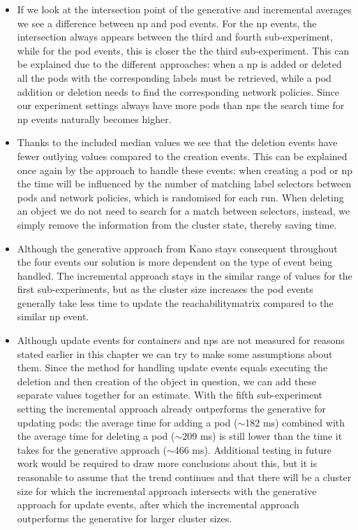 \begin{itemize}
    \item If we look at the intersection point of the generative and incremental averages we see a difference between \acrshort{np} and pod events. For the \acrshort{np} events, the intersection always appears between the third and fourth sub-experiment, while for the pod events, this is closer the the third sub-experiment. This can be explained due to the different approaches: when a \acrshort{np} is added or deleted all the pods with the corresponding labels must be retrieved, while a pod addition or deletion needs to find the corresponding network policies. Since our experiment settings always have more pods than \acrshort{np}s the search time for \acrshort{np} events naturally becomes higher.
    
    \item Thanks to the included median values we see that the deletion events have fewer outlying values compared to the creation events. This can be explained once again by the approach to handle these events: when creating a pod or \acrshort{np} the time will be influenced by the number of matching label selectors between pods and network policies, which is randomised for each run. When deleting an object we do not need to search for a match between selectors, instead, we simply remove the information from the cluster state, thereby saving time.
    
    \item Although the generative approach from Kano stays consequent throughout the four events our solution is more dependent on the type of event being handled. The incremental approach stays in the similar range of values for the first sub-experiments, but as the cluster size increases the pod events generally take less time to update the reachabilitymatrix compared to the similar \acrshort{np} event. 
    
    \item Although update events for containers and \acrshort{np}s are not measured for reasons stated earlier in this chapter we can try to make some assumptions about them. Since the method for handling update events equals executing the deletion and then creation of the object in question, we can add these separate values together for an estimate. With the fifth sub-experiment setting the incremental approach already outperforms the generative for updating pods: the average time for adding a pod ($\sim$182 ms) combined with the average time for deleting a pod ($\sim$209 ms) is still lower than the time it takes for the generative approach ($\sim$466 ms). Additional testing in future work would be required to draw more conclusions about this, but it is reasonable to assume that the trend continues and that there will be a cluster size for which the incremental approach intersects with the generative approach for update events, after which the incremental approach outperforms the generative for larger cluster sizes.
\end{itemize}

